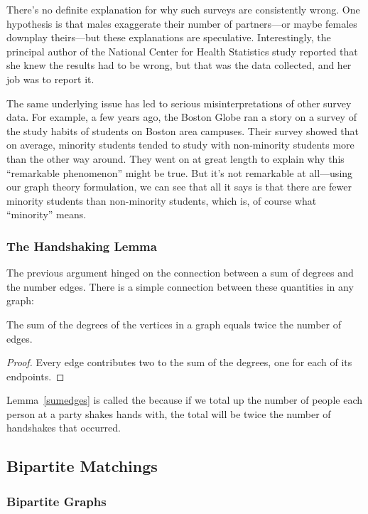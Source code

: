 There's no definite explanation for why such surveys are consistently
wrong.  One hypothesis is that males exaggerate their number of
partners---or maybe females downplay theirs---but these explanations
are speculative.  Interestingly, the principal author of the National
Center for Health Statistics study reported that she knew the results
had to be wrong, but that was the data collected, and her job was to
report it.

The same underlying issue has led to serious misinterpretations of
other survey data.  For example, a few years ago, the Boston Globe ran
a story on a survey of the study habits of students on Boston area
campuses.  Their survey showed that on average, minority students
tended to study with non-minority students more than the other way
around.  They went on at great length to explain why this ``remarkable
phenomenon'' might be true.  But it's not remarkable at all---using
our graph theory formulation, we can see that all it says is that
there are fewer minority students than non-minority students, which
is, of course what ``minority'' means.

\subsubsection{The Handshaking Lemma}

The previous argument hinged on the connection between a sum of
degrees and the number edges.  There is a simple connection between
these quantities in any graph:
\begin{lemma}\label{sumedges}
The sum of the degrees of the vertices in a graph equals twice the
number of edges.
\end{lemma}

\begin{proof}
Every edge contributes two to the sum of the degrees, one for each of
its endpoints.
\end{proof}

Lemma~\ref{sumedges} is called the  because if
we total up the number of people each person at a party shakes hands
with, the total will be twice the number of handshakes that occurred.

\subsection{Bipartite Matchings}\label{bipartitesec}
\begin{editingnotes}
\subsubsection*{Bipartite Graphs}\label{bipartitesubsec}
\end{editingnotes}

